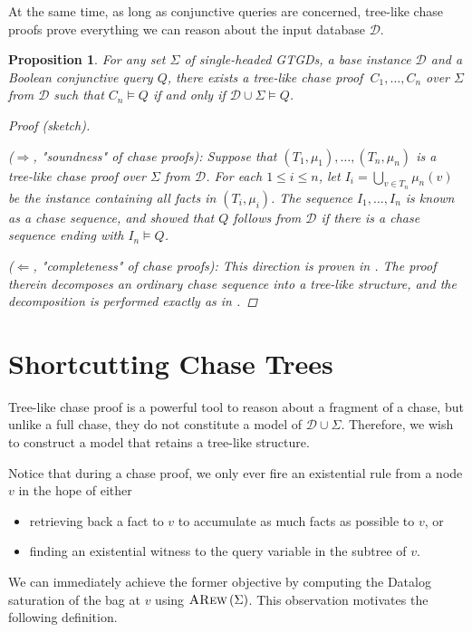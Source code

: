 \documentclass[12pt]{report}
\theoremstyle{plain}
\newtheorem{proposition}[theorem]{Proposition}
\theoremstyle{definition}
\newcommand{\ARew}[1]{\ensuremath{\normalfont{\textsc{ARew}} \left( #1 \right)}}
\begin{document}
At the same time, as long as conjunctive queries are concerned, tree-like chase proofs prove everything we can reason about the input database $\mathcal{D}$.

\begin{proposition}
\label{chase-proof-completeness}
  For any set $\Sigma$ of single-headed GTGDs, a base instance $\mathcal{D}$ and a Boolean conjunctive query $Q$, there exists a tree-like chase proof $\ C_1, \ldots, C_n$ over $\Sigma$ from $\mathcal{D}$ such that $C_n \models Q$ if and only if $\mathcal{D} \cup \Sigma \models Q$.
  \begin{proof}[Proof (sketch)] $ $\par
    ($\Longrightarrow$, "soundness" of chase proofs): Suppose that $(T_1, \mu_1), \ldots, (T_n, \mu_n)$ is a tree-like chase proof over $\Sigma$ from $\mathcal{D}$. For each $1 \leq i \leq n$, let $I_i = \bigcup_{v \in T_n} \mu_n(v)$ be the instance containing all facts in $(T_i, \mu_i)$. The sequence $I_1, \ldots, I_n$ is known as a \emph{chase sequence}, and \cite{fagin_kolaitis_miller_popa_2005} showed that $Q$ follows from $\mathcal{D}$ if there is a chase sequence ending with $I_n \models Q$.

    ($\Longleftarrow$, "completeness" of chase proofs): This direction is proven in \cite[Proposition 2.6.9]{kappelmann_2019}. The proof therein decomposes an ordinary chase sequence into a tree-like structure, and the decomposition is performed exactly as in .
  \end{proof}
\end{proposition}

\section{Shortcutting Chase Trees}

Tree-like chase proof is a powerful tool to reason about a fragment of a chase, but unlike a full chase, they do not constitute a model of $\mathcal{D} \cup \Sigma$. Therefore, we wish to construct a model that retains a tree-like structure.

Notice that during a chase proof, we only ever fire an existential rule from a node $v$ in the hope of either
\begin{itemize}
  \item retrieving back a fact to $v$ to accumulate as much facts as possible to $v$, or
  \item finding an existential witness to the query variable in the subtree of $v$.
\end{itemize}
We can immediately achieve the former objective by computing the Datalog saturation of the bag at $v$ using $\ARew{\Sigma}$. This observation motivates the following definition.
\end{document}
